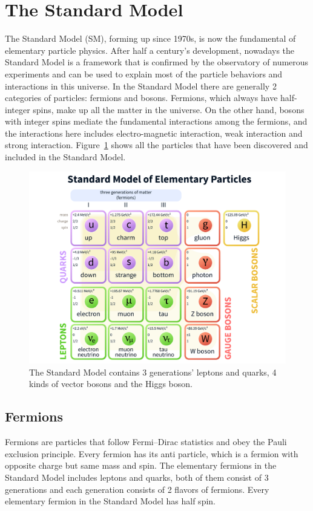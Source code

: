 
\section{The Standard Model}
The Standard Model (SM)\cite{SMref1}\cite{SMref2}\cite{SMref3}, forming up since 1970s, is now the fundamental of elementary particle physics. After half a century's development, nowadays the Standard Model is a framework that is confirmed by the observatory of numerous experiments and can be used to explain most of the particle behaviors and interactions in this universe. In the Standard Model there are generally 2 categories of particles: fermions and bosons. Fermions, which always have half-integer spins, make up all the matter in the universe. On the other hand, bosons with integer spins mediate the fundamental interactions among the fermions, and the interactions here includes electro-magnetic interaction, weak interaction and strong interaction. Figure~\ref{fig:smpfamily} shows all the particles that have been discovered and included in the Standard Model.
\begin{figure}[htbp]
\begin{center}
\includegraphics[width=0.72\linewidth]{figures/smpfamily.pdf}
\caption{The Standard Model contains 3 generations' leptons and quarks, 4 kinds of vector bosons and the Higgs boson.}
\label{fig:smpfamily}
\end{center}
\end{figure}

\subsection{Fermions}
Fermions are particles that follow Fermi–Dirac statistics and obey the Pauli exclusion principle. Every fermion has its anti particle, which is a fermion with opposite charge but same mass and spin. The elementary fermions in the Standard Model includes leptons and quarks, both of them consist of 3 generations and each generation consists of 2 flavors of fermions. Every elementary fermion in the Standard Model has half spin.
